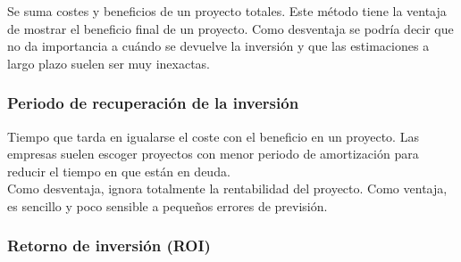 \documentclass[12pt]{article}
\begin{document}
{Se suma costes y beneficios de un proyecto totales. Este método tiene la ventaja de mostrar el beneficio final de un proyecto. Como desventaja se podría decir que no da importancia a cuándo se devuelve la inversión y que las estimaciones a largo plazo suelen ser muy inexactas.}

\begin{table}[ht]
\centering
{}
\caption{Beneficios Netos}
\label{tab:2.1}
\end{table}

\subsubsection{Periodo de recuperación de la inversión}
\label{2.5.2}

{Tiempo que tarda en igualarse el coste con el beneficio en un proyecto. Las empresas suelen escoger proyectos con menor periodo de amortización para reducir el tiempo en que están en deuda.} \\

{Como desventaja, ignora totalmente la rentabilidad del proyecto. Como ventaja, es sencillo y poco sensible a pequeños errores de previsión.}

\subsubsection{Retorno de inversión (ROI)}
\label{2.5.3}
\end{document}

